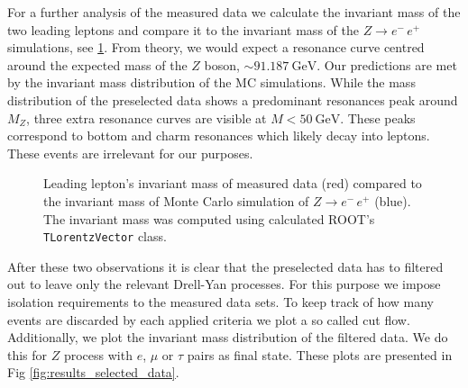 \documentclass[11 pt]{article}
\begin{document}
For a further analysis of the measured data we calculate the invariant mass of the two leading leptons and compare it to the invariant mass of the $Z\to e^-\,e^+$ simulations, see \ref{fig:inv_mas}. From theory, we would expect a resonance curve centred around the expected mass of the $Z$ boson, $\sim \SI{91,187}{\giga\electronvolt}$. Our predictions are met by the invariant mass distribution of the MC simulations. While the mass distribution of the preselected data shows a predominant resonances peak around $M_Z$, three extra resonance curves are visible at $M< \SI{50}{\giga\electronvolt}$. These peaks correspond to bottom and charm resonances which likely decay into leptons. These events are irrelevant for our purposes. 
\begin{figure}[htbp]
    \centering
    \begin{subfigure}{0.5\textwidth}
        \centering
    \end{subfigure}
        \caption{\small Leading lepton's invariant mass of measured data (red) compared to the invariant mass of Monte Carlo simulation of $Z\to e^-\,e^+$ (blue). The invariant mass was computed using calculated ROOT's \texttt{TLorentzVector} class.}
        \label{fig:inv_mas}
\end{figure}

After these two observations it is clear that the preselected data has to filtered out to leave only the relevant Drell-Yan processes. For this purpose we impose isolation requirements to the measured data sets. To keep track of how many events are discarded by each applied criteria we plot a so called cut flow. Additionally, we plot the invariant mass distribution of the filtered data. We do this for $Z$ process with $e$, $\mu$ or $\tau$ pairs as final state. These plots are presented in Fig \ref{fig:results_selected_data}. 
\end{document}
